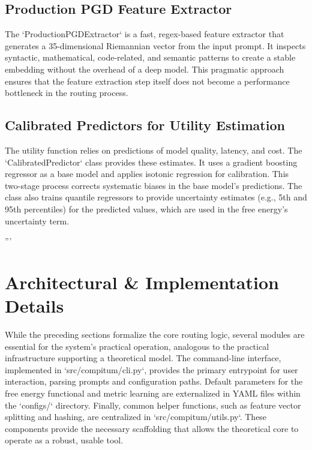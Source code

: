 \documentclass[11pt]{article}
\begin{document}
\subsection{Production PGD Feature Extractor}
\label{sec:bk2_pgd_feature_extractor}
The `ProductionPGDExtractor` is a fast, regex-based feature extractor that generates a 35-dimensional Riemannian vector from the input prompt. It inspects syntactic, mathematical, code-related, and semantic patterns to create a stable embedding without the overhead of a deep model. This pragmatic approach ensures that the feature extraction step itself does not become a performance bottleneck in the routing process.

\subsection{Calibrated Predictors for Utility Estimation}
\label{sec:bk2_calibrated_predictors}
The utility function relies on predictions of model quality, latency, and cost. The `CalibratedPredictor` class provides these estimates. It uses a gradient boosting regressor as a base model and applies isotonic regression for calibration. This two-stage process corrects systematic biases in the base model's predictions. The class also trains quantile regressors to provide uncertainty estimates (e.g., 5th and 95th percentiles) for the predicted values, which are used in the free energy's uncertainty term.

'''
\section{Architectural \& Implementation Details}
\label{sec:implementation}
While the preceding sections formalize the core routing logic, several modules are essential for the system's practical operation, analogous to the practical infrastructure supporting a theoretical model. The command-line interface, implemented in `src/compitum/cli.py`, provides the primary entrypoint for user interaction, parsing prompts and configuration paths. Default parameters for the free energy functional and metric learning are externalized in YAML files within the `configs/` directory. Finally, common helper functions, such as feature vector splitting and hashing, are centralized in `src/compitum/utils.py`. These components provide the necessary scaffolding that allows the theoretical core to operate as a robust, usable tool.
\end{document}
